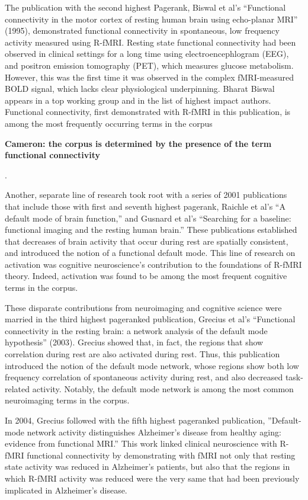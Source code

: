 \documentclass[5p]{elsarticle}
\newcommand\MyCBox[1]{%
  \colorbox{yellow!60}{\begin{varwidth}{\dimexpr\linewidth-2\fboxsep}#1\end{varwidth}}}
\newcommand{\COMMENTCC}[1]{\MyCBox{\textcolor{cc_commentcolor}{\textbf{Cameron:
#1}}}}
\begin{document}
The publication with the second highest Pagerank, Biswal et al’s ``Functional
connectivity in the motor cortex of resting human brain using echo-planar MRI''
(1995)\cite{Biswal1995}, demonstrated functional connectivity in spontaneous,
low frequency activity measured using R-fMRI. Resting state functional
connectivity had been observed in clinical settings for a long time using
electroencephlogram (EEG), and positron emission tomography (PET), which
measures glucose metabolism. However, this was the first time it was observed in
the complex fMRI-measured BOLD signal, which lacks clear physiological
underpinning. Bharat Biswal appears in a top working group and in the list of
highest impact authors. Functional connectivity, first demonstrated with R-fMRI
in this publication, is among the most frequently occurring terms in the corpus
\COMMENTCC{the corpus is determined by the presence of the term functional
connectivity}. 

Another, separate line of research took root with a series of 2001 publications
that include those with first and seventh highest pagerank, Raichle et al’s ``A
default mode of brain function,'' and Gusnard et al’s ``Searching for a baseline:
functional imaging and the resting human brain.'' These publications established
that decreases of brain activity that occur during rest are spatially
consistent, and introduced the notion of a functional default mode. This line of
research on activation was cognitive neuroscience’s contribution to the
foundations of R-fMRI theory. Indeed, activation was found to be among the most
frequent cognitive terms in the corpus.

These disparate contributions from neuroimaging and cognitive science were
married in the third highest pageranked publication, Grecius et al’s ``Functional
connectivity in the resting brain: a network analysis of the default mode
hypothesis'' (2003). Grecius showed that, in fact, the regions that show
correlation during rest are also activated during rest. Thus, this publication
introduced the notion of the default mode network, whose regions show both low
frequency correlation of spontaneous activity during rest, and also decreased
task-related activity. Notably, the default mode network is among the most
common neuroimaging terms in the corpus.

In 2004, Grecius followed with the fifth highest pageranked publication,
''Default-mode network activity distinguishes Alzheimer’s disease from healthy
aging: evidence from functional MRI.'' This work linked clinical neuroscience
with R-fMRI functional connectivity by demonstrating with fMRI not only that
resting state activity was reduced in Alzheimer’s patients, but also that the
regions in which R-fMRI activity was reduced were the very same that had been
previously implicated in Alzheimer’s disease. 
\end{document}
